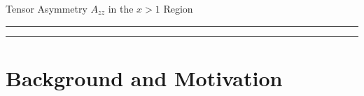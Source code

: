 \documentclass[12pt]{article}
\begin{document}
\pagestyle{empty}
 
\begin{center}
 \LARGE{
  Tensor Asymmetry $A_{zz}$ in the $x>1$ Region
 }
\end{center}
%
\hrule \vspace{.05cm}\hrule
%


\newpage

\begin{abstract}
  
\end{abstract}

\newpage


%


\clearpage


\tableofcontents


\pagestyle{plain}

\clearpage

%

\section{Background and Motivation}


%

% 
% 



%   
\end{document}
